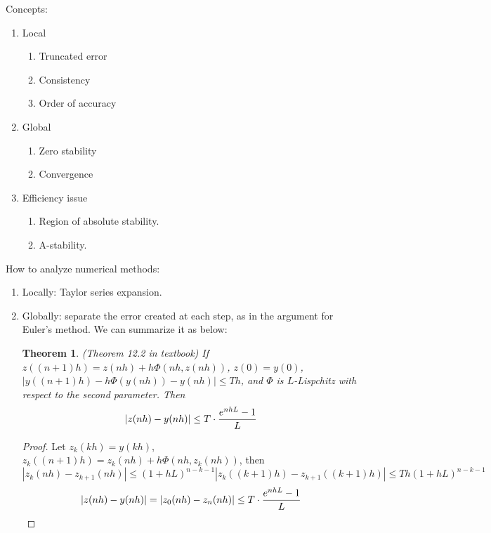 \documentclass[20pt]{article} %
\theoremstyle{break}
\newtheorem{thm}[definition]{Theorem}
\begin{document}
Concepts:
\begin{enumerate}
\item Local
  \begin{enumerate}
    \item Truncated error
    \item Consistency
    \item Order of accuracy
  \end{enumerate}
\item Global
  \begin{enumerate}
   \item Zero stability
   \item Convergence
  \end{enumerate}
\item Efficiency issue
  \begin{enumerate}
   \item Region of absolute stability.
   \item A-stability.
  \end{enumerate}
\end{enumerate}

\newpage

How to analyze numerical methods:

\begin{enumerate}
\item Locally: Taylor series expansion.
\item Globally: separate the error created at each step, as in the argument for Euler's method. We can summarize it as below:
  \begin{thm}\label{global}(Theorem 12.2 in textbook)
    If $z((n+1)h)=z(nh)+h\Phi(nh, z(nh))$, $z(0)=y(0)$, $|y((n+1)h)-h\Phi(y(nh))-y(nh)|\leq Th$, and $\Phi$ is $L$-Lispchitz with respect to the second parameter. Then
    \[|z(nh)-y(nh)|\leq T\cdot {e^{nhL}-1\over L}\]
 \end{thm}
 \begin{proof}
   Let $z_k(kh)=y(kh)$, $z_k((n+1)h)=z_k(nh)+h\Phi(nh, z_k(nh))$, then
   \[|z_k(nh)-z_{k+1}(nh)|\leq (1+hL)^{n-k-1}|z_k((k+1)h)-z_{k+1}((k+1)h)|\leq Th(1+hL)^{n-k-1}\]
   \[|z(nh)-y(nh)|=|z_0(nh)-z_n(nh)|\leq T\cdot {e^{nhL}-1\over L}\]
 \end{proof}
\end{enumerate}

\newpage
\end{document}
